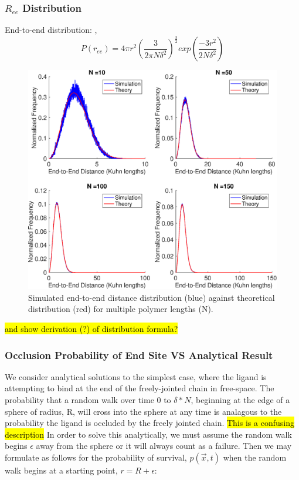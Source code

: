 \documentclass[../AdvancementSummary.tex]{subfiles}
\begin{document}
\subsubsection{$R_{ee}$ Distribution}

End-to-end distribution: \cite{VanValen2009}, \cite{Reeves2011}
\begin{equation*}
P(r_{ee}) = 4\pi r^2 \left( \frac{3}{2\pi N \delta^2}\right)^{\frac{3}{2}}exp\left(\frac{-3r^2}{2N \delta^2}\right)
\end{equation*}


\begin{figure}[H]
\begin{center}
\includegraphics[width=0.8\linewidth]{ModelConfirmationFigures/ReeDistribution.eps}
\caption{Simulated end-to-end distance distribution (blue) against theoretical distribution (red) for multiple polymer lengths (N). \label{fig: ReeDist}}
\end{center}
\end{figure}

\hl{and show derivation (?) of distribution formula?}

\subsubsection{Occlusion Probability of End Site VS Analytical Result}

We consider analytical solutions to the simplest case, where the ligand is attempting to bind at the end of the freely-jointed chain in free-space. The probability that a random walk over time 0 to $\delta*N$, beginning at the edge of a sphere of radius, R, will cross into the sphere at any time is analagous to the probability the ligand is occluded by the freely jointed chain. \hl{This is a confusing description} In order to solve this analytically, we must assume the random walk begins $\epsilon$ away from the sphere or it will always count as a failure. Then we may formulate as follows for the probability of survival, $p(\vec{x},t)$ when the random walk begins at a starting point, $r=R+\epsilon$:
\end{document}
